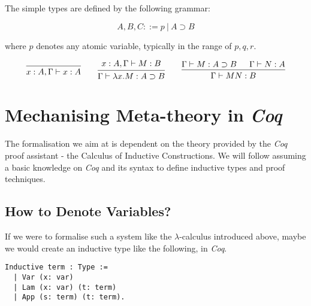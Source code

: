 \cite{Barendregt2013}

\begin{definition}
	The simple types are defined by the following grammar:
	
	\[
		A, B, C ::= p \ | \ A \supset B
	\]
	
	where $p$ denotes any atomic variable, typically in the range of $p, q, r$.
\end{definition}

\begin{definition}[Context]
\end{definition}

\begin{definition}
	\[
	\begin{prooftree}
		\infer0{ x:A, \Gamma \vdash x:A } 
	\end{prooftree}
	\qquad
	\begin{prooftree}
		\hypo{ x:A, \Gamma \vdash M:B }
		\infer1{ \Gamma \vdash \lambda x . M : A \supset B  } 
	\end{prooftree}
	\qquad
	\begin{prooftree}
		\hypo{ \Gamma \vdash M : A \supset B }
		\hypo{ \Gamma \vdash N : A }	
		\infer2{ \Gamma \vdash M N : B } 
	\end{prooftree}
	\]
\end{definition}


\section{Mechanising Meta-theory in \textit{Coq}}

The formalisation we aim at is dependent on the theory provided by the \textit{Coq} proof assistant - the Calculus of Inductive Constructions.
We will follow assuming a basic knowledge on \textit{Coq} and its syntax to define inductive types and proof techniques.

\subsection{How to Denote Variables?}

If we were to formalise such a system like the $\lambda$-calculus introduced above, maybe we would create an inductive type like the following, in \textit{Coq}.

\begin{lstlisting}[language=Coq]
  Inductive term : Type :=
  | Var (x: var)
  | Lam (x: var) (t: term)
  | App (s: term) (t: term).
\end{lstlisting}

